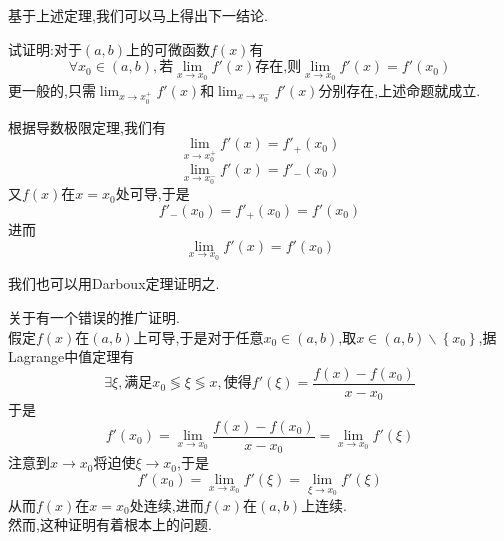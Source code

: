 \documentclass{ctexart}
\begin{document}
基于上述定理,我们可以马上得出下一结论.
\begin{problem}[Example 3.]
    试证明:对于$(a,b)$上的可微函数$f(x)$有
    $$\forall x_0\in(a,b),\text{若}\lim_{x\to x_0}f'(x)\text{存在,则}\lim_{x\to x_0}f'(x)=f'(x_0)$$
    更一般的,只需$\displaystyle\lim_{x\to x_0^+}f'(x)$和$\displaystyle\lim_{x\to x_0^-}f'(x)$分别存在,上述命题就成立.
\end{problem}
\begin{solution}
    根据导数极限定理,我们有
    $$\lim_{x\to x_0^+}f'(x)=f'_+(x_0)$$
    $$\lim_{x\to x_0^-}f'(x)=f'_-(x_0)$$
    又$f(x)$在$x=x_0$处可导,于是
    $$f'_-(x_0)=f'_+(x_0)=f'(x_0)$$
    进而$$\lim_{x\to x_0}f'(x)=f'(x_0)$$
\end{solution}
\begin{solution}
    我们也可以用Darboux定理证明之.
\end{solution}
\begin{analyze}
    关于有一个错误的推广证明.\\
    假定$f(x)$在$(a,b)$上可导,于是对于任意$x_0\in(a,b)$,取$x\in(a,b)\backslash\left\{x_0\right\}$,据Lagrange中值定理有
    $$\exists\xi,\text{满足}x_0\lessgtr\xi\lessgtr x,\text{使得}f'(\xi)=\dfrac{f(x)-f(x_0)}{x-x_0}$$
    于是$$f'(x_0)=\lim_{x\to x_0}\dfrac{f(x)-f(x_0)}{x-x_0}=\lim_{x\to x_0}f'(\xi)$$
    注意到$x\to x_0$将迫使$\xi\to x_0$,于是
    $$f'(x_0)=\lim_{x\to x_0}f'(\xi)=\lim_{\xi\to x_0}f'(\xi)$$
    从而$f(x)$在$x=x_0$处连续,进而$f(x)$在$(a,b)$上连续.\\
    然而,这种证明有着根本上的问题.
\end{analyze}
\end{document}
